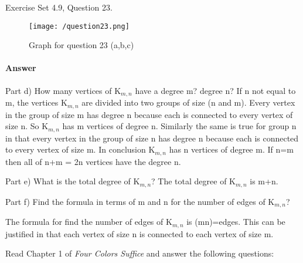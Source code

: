 \documentclass{article}
\begin{document}

Exercise Set 4.9, Question 23.
\begin{figure}
  \texttt{[image: /question23.png]}
  \caption{Graph for question 23 (a,b,c)}
  \label{fig:question23}
\end{figure}

\paragraph{Answer}
Part d) How many vertices of K$_{m,n}$ have a degree m? degree n?
If n not equal to m, the vertices K$_{m,n}$ are divided into two groups of size (n and m).
Every vertex in the group of size m has degree n because each is connected to
every vertex of size n. So K$_{m,n}$ has m vertices of degree n.
Similarly the same is true for group n in that every vertex in the group of
size n has degree n because each is connected to every vertex of size m.
In conclusion K$_{m,n}$ has n vertices of degree m.
If n=m then all of n+m = 2n vertices have the degree n.


Part e) What is the total degree of K$_{m,n}$?
The total degree of K$_{m,n}$ is m+n.


Part f) Find the formula in terms of m and n for the number of edges of K$_{m,n}$?

The formula for find the number of edges of K$_{m,n}$ is (mn)=edges.
This can be justified in that
each vertex of size n is connected to each vertex of size m.


Read Chapter 1 of \emph{Four Colors Suffice} and answer the following questions:
\end{document}
